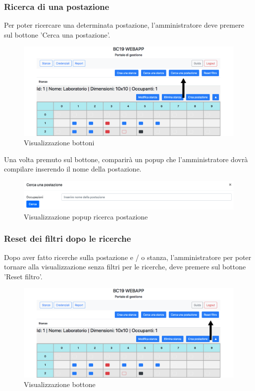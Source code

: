 \subsubsection{Ricerca di una postazione}
Per poter ricercare una determinata postazione, l'amministratore deve premere sul bottone 'Cerca una postazione'.
\begin{figure}[H]
	\centering
	\includegraphics[width=15cm]{res/images/bottoneSearchWorkstation.png}
	\caption{Visualizzazione bottoni}
\end{figure}
Una volta premuto sul bottone, comparirà un popup che l'amministratore dovrà compilare inserendo il nome della postazione.
\begin{figure}[H]
	\centering
	\includegraphics[width=15cm]{res/images/searchWorkstation.png}
	\caption{Visualizzazione popup ricerca postazione}
\end{figure}

\subsubsection{Reset dei filtri dopo le ricerche}
Dopo aver fatto ricerche sulla postazione e / o stanza, l'amministratore per poter tornare alla visualizzazione senza filtri per le ricerche, deve premere sul bottone 'Reset filtro'.
\begin{figure}[H]
	\centering
	\includegraphics[width=15cm]{res/images/resetFiltri.png}
	\caption{Visualizzazione bottone}
\end{figure}

